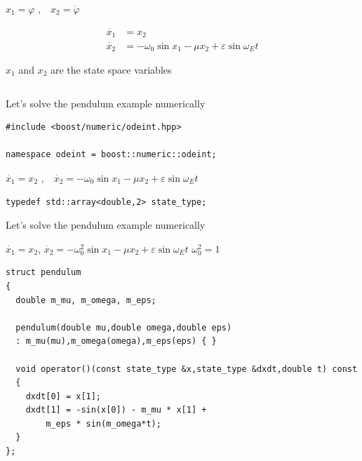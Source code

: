 \documentclass{beamer}
\begin{document}
\begin{frame}[fragile]
\begin{columns}[T]
\begin{column}{0.65\textwidth}
 \vspace{1ex}

 \centerline{$x_1 = \varphi \,\, \text{,} \quad x_2 = \dot{\varphi}$}

 \vspace{-3ex}
 \begin{align*}
   \dot{x_1} &= x_2 \\
   \dot{x_2} &= - \omega_0  \sin x_1 - \mu x_2 + \varepsilon \sin \omega_E t  
 \end{align*}


 $x_1$ and $x_2$ are the state space variables
  
  \end{column}
\end{columns}

 

\end{frame}

\begin{frame}[fragile]

\centerline{ \Large Let's solve the pendulum example numerically}

\vspace{2ex}
\begin{lstlisting}
#include <boost/numeric/odeint.hpp>

namespace odeint = boost::numeric::odeint;
\end{lstlisting}

\vspace{2ex}

\centerline{$\dot{x_1} = x_2 \,\,\text{,} \quad \dot{x_2} = - \omega_0 \sin x_1 - \mu x_2 + \varepsilon \sin \omega_E t$}

\vspace{2ex}
\begin{lstlisting}
typedef std::array<double,2> state_type;
\end{lstlisting}

\end{frame}

\begin{frame}[fragile]

\centerline{ \Large Let's solve the pendulum example numerically}

\vspace{2ex}

$\dot{x_1} = x_2$, $\dot{x_2} = - \omega_0^2 \sin x_1 - \mu x_2 + \varepsilon \sin \omega_E t$ \hspace{6ex} $\omega_0^2 = 1$

\vspace{2ex}

\begin{lstlisting}
struct pendulum
{
  double m_mu, m_omega, m_eps;

  pendulum(double mu,double omega,double eps)
  : m_mu(mu),m_omega(omega),m_eps(eps) { }

  void operator()(const state_type &x,state_type &dxdt,double t) const
  {
    dxdt[0] = x[1];
    dxdt[1] = -sin(x[0]) - m_mu * x[1] +
        m_eps * sin(m_omega*t);
  }
};
\end{lstlisting}

\end{frame}
\end{document}
